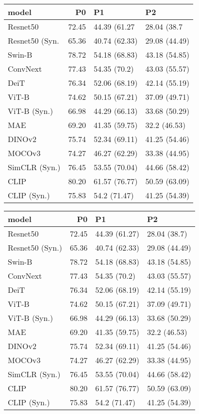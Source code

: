 \begin{tabular}{lrll}
\toprule
model & P0 & P1 & P2 \\
\midrule
Resnet50 & 72.45 & 44.39 (61.27 & 28.04 (38.7 \\
Resnet50 (Syn. & 65.36 & 40.74 (62.33) & 29.08 (44.49) \\
Swin-B & 78.72 & 54.18 (68.83) & 43.18 (54.85) \\
ConvNext & 77.43 & 54.35 (70.2) & 43.03 (55.57) \\
DeiT & 76.34 & 52.06 (68.19) & 42.14 (55.19) \\
ViT-B & 74.62 & 50.15 (67.21) & 37.09 (49.71) \\
ViT-B (Syn.) & 66.98 & 44.29 (66.13) & 33.68 (50.29) \\
MAE & 69.20 & 41.35 (59.75) & 32.2 (46.53) \\
DINOv2 & 75.74 & 52.34 (69.11) & 41.25 (54.46) \\
MOCOv3 & 74.27 & 46.27 (62.29) & 33.38 (44.95) \\
SimCLR (Syn.) & 76.45 & 53.55 (70.04) & 44.66 (58.42) \\
CLIP & 80.20 & 61.57 (76.77) & 50.59 (63.09) \\
CLIP (Syn.) & 75.83 & 54.2 (71.47) & 41.25 (54.39) \\
\bottomrule
\end{tabular}




\begin{tabular}{lrll}
	\toprule
	model           & P0    & P1            & P2            \\
	\midrule
	Resnet50        & 72.45 & 44.39 (61.27) & 28.04 (38.7)  \\
	Resnet50 (Syn.) & 65.36 & 40.74 (62.33) & 29.08 (44.49) \\
	Swin-B          & 78.72 & 54.18 (68.83) & 43.18 (54.85) \\
	ConvNext        & 77.43 & 54.35 (70.2)  & 43.03 (55.57) \\
	DeiT            & 76.34 & 52.06 (68.19) & 42.14 (55.19) \\
	ViT-B           & 74.62 & 50.15 (67.21) & 37.09 (49.71) \\
	ViT-B (Syn.)    & 66.98 & 44.29 (66.13) & 33.68 (50.29) \\
	MAE             & 69.20 & 41.35 (59.75) & 32.2 (46.53)  \\
	DINOv2          & 75.74 & 52.34 (69.11) & 41.25 (54.46) \\
	MOCOv3          & 74.27 & 46.27 (62.29) & 33.38 (44.95) \\
	SimCLR (Syn.)   & 76.45 & 53.55 (70.04) & 44.66 (58.42) \\
	CLIP            & 80.20 & 61.57 (76.77) & 50.59 (63.09) \\
	CLIP (Syn.)     & 75.83 & 54.2 (71.47)  & 41.25 (54.39) \\
	\bottomrule
\end{tabular}



